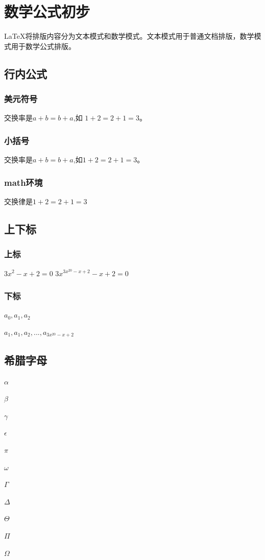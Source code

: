 \documentclass[12pt]{ctexbook}  %
\begin{document}
	\chapter{数学公式初步}
	\LaTeX{}将排版内容分为文本模式和数学模式。文本模式用于普通文档排版，数学模式用于数学公式排版。
	\section{行内公式}
	\subsection{美元符号}
	交换率是$a+b=b+a$,如 $1+2=2+1=3$。
	\subsection{小括号}
	交换率是\(a+b=b+a\),如\(1+2=2+1=3\)。
	\subsection{math环境}
	交换律是\begin{math}
	1+2=2+1=3
	\end{math}
	\section{上下标}
	\subsection{上标}
	$3x^2 - x + 2 = 0$
	$3x^{3x^{20} - x + 2} - x + 2 = 0 $
	\subsection{下标}
	$a_0, a_1, a_2$
	
	$a_1, a_1, a_2, ..., a_{3x^{20} - x + 2}$
	\section{希腊字母}
	$\alpha$
	
	$\beta$
	
	$\gamma$
	
	$\epsilon$
	
	$\pi$
	
	$\omega$
	
	$\Gamma$
	
	$\Delta$
	
	$\Theta$
	
	$\Pi$
	
	$\Omega$
\end{document}
